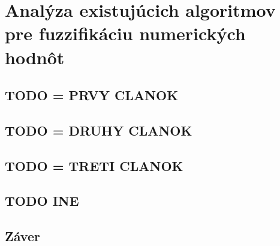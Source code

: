 \chapter{Analýza existujúcich algoritmov pre fuzzifikáciu numerických hodnôt} 

\section{TODO = PRVY CLANOK }

\section{TODO = DRUHY CLANOK}

\section{TODO = TRETI CLANOK}

\section{TODO INE }

\section{Záver}